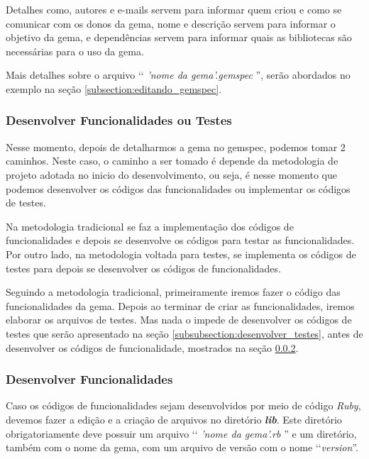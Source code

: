 Detalhes como, autores e e-mails servem para informar quem criou e como se comunicar com os donos da gema,
nome e descrição servem para informar o objetivo da gema, e dependências servem para informar quais as bibliotecas
são necessárias para o uso da gema.

Mais detalhes sobre o arquivo ‘‘ \emph{'nome da gema'.gemspec }'', serão abordados no exemplo na seção
\ref{subsection:editando_gemspec}.


\subsubsection{Desenvolver Funcionalidades ou Testes}
\label{subsubsection:desenvolver_funcionalidades_ou_testes}


Nesse momento, depois de detalharmos a gema no gemspec, podemos tomar 2 caminhos. Neste caso, o caminho a ser
tomado é depende da metodologia de projeto adotada no inicio do desenvolvimento, ou seja, é nesse
momento que podemos desenvolver os códigos das funcionalidades ou implementar os códigos de testes.

Na metodologia tradicional se faz a implementação dos códigos de funcionalidades e depois se
desenvolve os códigos para testar as funcionalidades. Por outro lado, na metodologia voltada para
testes, se implementa os códigos de testes para depois se desenvolver os códigos de funcionalidades.

Seguindo a metodologia tradicional, primeiramente iremos fazer o código das funcionalidades da gema.
Depois ao terminar de criar as funcionalidades, iremos elaborar os arquivos de testes. Mas nada o impede
de desenvolver os códigos de testes que serão apresentado na seção \ref{subsubsection:desenvolver_testes},
antes de desenvolver os códigos de funcionalidade, mostrados na seção
\ref{subsubsection:desenvolver_funcionalidades}.


\subsubsection{Desenvolver Funcionalidades}
\label{subsubsection:desenvolver_funcionalidades}


Caso os códigos de funcionalidades sejam desenvolvidos por meio de código \emph{Ruby}, devemos fazer a
edição e a criação de arquivos no diretório \emph{\textbf{lib}}. Este diretório obrigatoriamente deve
possuir um arquivo ‘‘ \emph{'nome da gema'.rb }'' e um diretório, também com o nome da gema, com um arquivo
de versão com o nome ‘‘\emph{version}''.

